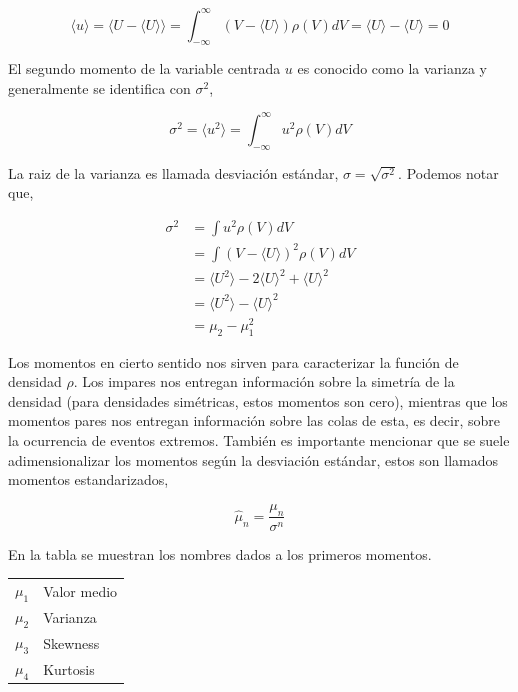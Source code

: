 \documentclass[executivepaper,12pt]{article}
\numberwithin{equation}{section}
\begin{document}
 \begin{equation*}
 	\langle u\rangle=\langle U-\langle U\rangle\rangle= \int_{-\infty}^{\infty}( V-\langle U\rangle )\rho(V)dV =\langle U \rangle - \langle U \rangle =0
 \end{equation*}
 
 El segundo momento de la variable centrada $u$ es conocido como la varianza y generalmente se identifica con $\sigma^2 $, 
 
 \begin{equation}
 	\sigma^2= \langle u^2\rangle= \int_{-\infty}^{\infty} u^2 \rho(V)dV
 \end{equation}

La raiz de la varianza es llamada desviación estándar, $\sigma = \sqrt{\sigma^2}$. Podemos notar que, 

\begin{align*}
	\sigma^2 &= \int u^2 \rho(V)dV\\
	&=\int (V-\langle U \rangle)^2  \rho(V)dV \\
	&= \langle U^2 \rangle - 2\langle U\rangle^2 + \langle U\rangle^2\\
	&= \langle U^2 \rangle - \langle U\rangle^2\\
	&=\mu_ 2 -\mu_1 ^2 
\end{align*}

Los momentos en cierto sentido nos sirven para caracterizar la función de densidad $\rho$. Los impares nos entregan información sobre la simetría de la densidad (para densidades simétricas, estos momentos son cero), mientras que los momentos pares nos entregan información sobre las colas de esta, es decir, sobre la ocurrencia de eventos extremos. También es importante mencionar que se suele adimensionalizar los momentos según la desviación estándar, estos son llamados momentos estandarizados, 

\begin{equation*}
	\hat{\mu}_n=\frac{\mu_n}{\sigma^n}
\end{equation*}     

En la tabla se muestran los nombres dados a los primeros momentos. 
\begin{table}[H]
	\centering
	\begin{tabular}{ll}
	$\mu_1$	& Valor medio   \\
	$\mu_2$	& Varianza   \\
	$\mu_3$	& Skewness   \\
	$\mu_4$	& Kurtosis  
	\end{tabular}
\end{table}
\end{document}
